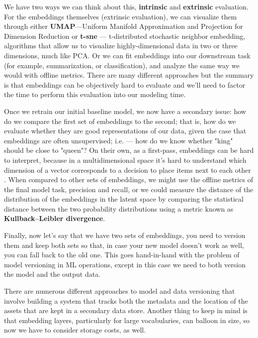 \documentclass[11pt, table]{diazessay} %
\begin{document}
\begin{sloppypar}
We have two ways we can think about this, \textbf{intrinsic} and \textbf{extrinsic} evaluation. For the embeddings themselves (extrinsic evaluation), we can visualize them through either \textbf{UMAP}---Uniform Manifold Approximation and Projection for Dimension Reduction or \textbf{t-sne} --- t-distributed stochastic neighbor embedding, algorithms that allow us to visualize highly-dimensional data in two or three dimensions, much like PCA. Or we can fit embeddings into our downstream task (for example, summarization, or classification), and analyze the same way we would with offline metrics. There are many different approaches
 \citep{wang2019evaluating} but the summary is that embeddings can be objectively hard to evaluate and we'll need to factor the time to perform this evaluation into our modeling time.

Once we retrain our initial baseline model, we now have a secondary issue: how do we compare the first set of embeddings to the second; that is, how do we evaluate whether they are good representations of our data, given the case that embeddings are often unsupervised; i.e. --- how do we know whether "king" should be close to "queen"? On their own, as a first-pass, embeddings can be hard to interpret, because in a multidimensional space it's hard to understand which dimension of a vector corresponds to a decision to place items next to each other \citep{simhi2022interpreting}.  When compared to other sets of embeddings, we might use the offline metrics of the final model task, precision and recall, or we could measure the distance of the distribution of the embeddings in the latent space by comparing the statistical distance between the two probability distributions using a metric known as \textbf{Kullback–Leibler divergence}.

Finally, now let's say that we have two sets of embeddings, you need to version them and keep both sets so that, in case your new model doesn't work as well, you can fall back to the old one. This goes hand-in-hand with the problem of model versioning in ML operations, except in this case we need to both version the model and the output data.

There are numerous different approaches to model and data versioning that involve building a system that tracks both the metadata and the location of the assets that are kept in a secondary data store. Another thing to keep in mind is that embedding layers, particularly for large vocabularies, can balloon in size, so now we have to consider storage costs, as well.



\end{sloppypar}
\end{document}
